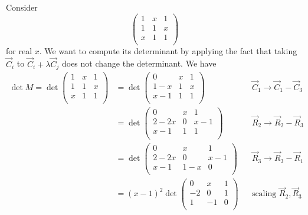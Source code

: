\documentclass{../../template/note}
\begin{document}
    \begin{example}
        Consider
        \[
            \begin{pmatrix}
             1 & x & 1 \\
             1 & 1 & x \\
             x & 1 & 1 \\
            \end{pmatrix}
        \]
        for real \(x\). We want to compute its determinant by applying the fact that taking \(\vec C_i\) to \(\vec C_i + \lambda \vec C_j\) does not change the determinant. We have
        \begin{align*}
            \det M = \det \begin{pmatrix}
             1 & x & 1 \\
             1 & 1 & x \\
             x & 1 & 1 \\
            \end{pmatrix} &= \det \begin{pmatrix}
             0 & x & 1 \\
             1-x & 1 & x \\
             x-1 & 1 & 1 \\
            \end{pmatrix} && \vec C_1 \to \vec C_1 - \vec C_3 \\
            &= \det \begin{pmatrix}
             0 & x & 1 \\
             2-2x & 0 & x-1 \\
             x-1 & 1 & 1 \\
            \end{pmatrix} && \vec R_2 \to \vec R_2 - \vec R_3 \\
            &= \det \begin{pmatrix}
             0 & x & 1 \\
             2-2x & 0 & x-1 \\
             x-1 & 1-x & 0 \\
            \end{pmatrix} && \vec R_3 \to \vec R_3 - \vec R_1 \\
            &= (x-1)^2 \det \begin{pmatrix}
             0 & x & 1 \\
             -2 & 0 & 1 \\
             1 & -1 & 0 \\
            \end{pmatrix} && \text{scaling } \vec R_2, \vec R_3 \\

\end{align*}
\end{example}
\end{document}
